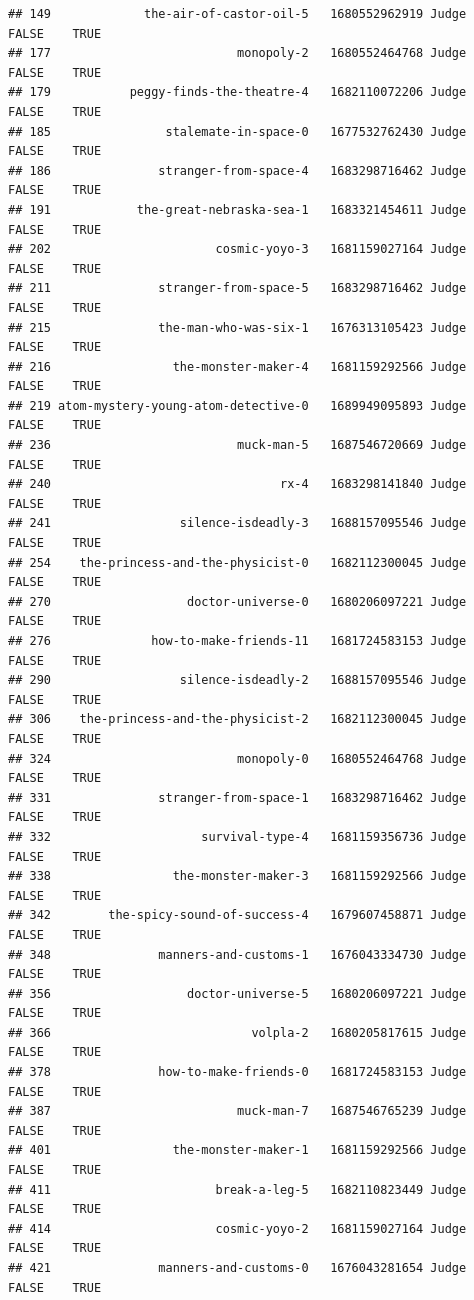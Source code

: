 \documentclass[
]{article}
\begin{document}
\begin{verbatim}
## 149             the-air-of-castor-oil-5   1680552962919 Judge   FALSE    TRUE
## 177                          monopoly-2   1680552464768 Judge   FALSE    TRUE
## 179           peggy-finds-the-theatre-4   1682110072206 Judge   FALSE    TRUE
## 185                stalemate-in-space-0   1677532762430 Judge   FALSE    TRUE
## 186               stranger-from-space-4   1683298716462 Judge   FALSE    TRUE
## 191            the-great-nebraska-sea-1   1683321454611 Judge   FALSE    TRUE
## 202                       cosmic-yoyo-3   1681159027164 Judge   FALSE    TRUE
## 211               stranger-from-space-5   1683298716462 Judge   FALSE    TRUE
## 215               the-man-who-was-six-1   1676313105423 Judge   FALSE    TRUE
## 216                 the-monster-maker-4   1681159292566 Judge   FALSE    TRUE
## 219 atom-mystery-young-atom-detective-0   1689949095893 Judge   FALSE    TRUE
## 236                          muck-man-5   1687546720669 Judge   FALSE    TRUE
## 240                                rx-4   1683298141840 Judge   FALSE    TRUE
## 241                  silence-isdeadly-3   1688157095546 Judge   FALSE    TRUE
## 254    the-princess-and-the-physicist-0   1682112300045 Judge   FALSE    TRUE
## 270                   doctor-universe-0   1680206097221 Judge   FALSE    TRUE
## 276              how-to-make-friends-11   1681724583153 Judge   FALSE    TRUE
## 290                  silence-isdeadly-2   1688157095546 Judge   FALSE    TRUE
## 306    the-princess-and-the-physicist-2   1682112300045 Judge   FALSE    TRUE
## 324                          monopoly-0   1680552464768 Judge   FALSE    TRUE
## 331               stranger-from-space-1   1683298716462 Judge   FALSE    TRUE
## 332                     survival-type-4   1681159356736 Judge   FALSE    TRUE
## 338                 the-monster-maker-3   1681159292566 Judge   FALSE    TRUE
## 342        the-spicy-sound-of-success-4   1679607458871 Judge   FALSE    TRUE
## 348               manners-and-customs-1   1676043334730 Judge   FALSE    TRUE
## 356                   doctor-universe-5   1680206097221 Judge   FALSE    TRUE
## 366                            volpla-2   1680205817615 Judge   FALSE    TRUE
## 378               how-to-make-friends-0   1681724583153 Judge   FALSE    TRUE
## 387                          muck-man-7   1687546765239 Judge   FALSE    TRUE
## 401                 the-monster-maker-1   1681159292566 Judge   FALSE    TRUE
## 411                       break-a-leg-5   1682110823449 Judge   FALSE    TRUE
## 414                       cosmic-yoyo-2   1681159027164 Judge   FALSE    TRUE
## 421               manners-and-customs-0   1676043281654 Judge   FALSE    TRUE

\end{verbatim}
\end{document}
